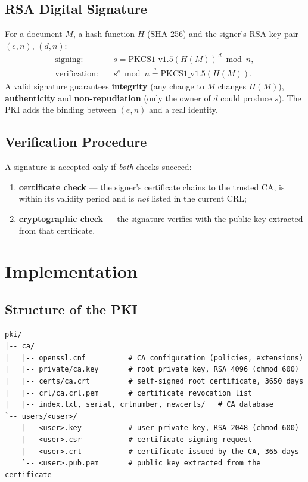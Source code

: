 \documentclass[12pt,a4paper]{article}
\begin{document}
\subsection{RSA Digital Signature}
For a document $M$, a hash function $H$ (SHA-256) and the signer's RSA key pair $(e,n)$, $(d,n)$:
\begin{align}
  \text{signing:}\quad & s = \mathrm{PKCS1\_v1.5}(H(M))^{\,d} \bmod n,\\
  \text{verification:}\quad & s^{e} \bmod n \stackrel{?}{=} \mathrm{PKCS1\_v1.5}(H(M)).
\end{align}
A valid signature guarantees \textbf{integrity} (any change to $M$ changes $H(M)$),
\textbf{authenticity} and \textbf{non-repudiation} (only the owner of $d$ could produce $s$).
The PKI adds the binding between $(e,n)$ and a real identity.

\subsection{Verification Procedure}
A signature is accepted only if \emph{both} checks succeed:
\begin{enumerate}
  \item \textbf{certificate check} — the signer's certificate chains to the trusted CA, is within
        its validity period and is \emph{not} listed in the current CRL;
  \item \textbf{cryptographic check} — the signature verifies with the public key extracted from
        that certificate.
\end{enumerate}

\section{Implementation}
\subsection{Structure of the PKI}
\begin{lstlisting}[style=sh, numbers=none, caption={Files created by \texttt{pki.sh}}]
pki/
|-- ca/
|   |-- openssl.cnf          # CA configuration (policies, extensions)
|   |-- private/ca.key       # root private key, RSA 4096 (chmod 600)
|   |-- certs/ca.crt         # self-signed root certificate, 3650 days
|   |-- crl/ca.crl.pem       # certificate revocation list
|   |-- index.txt, serial, crlnumber, newcerts/   # CA database
`-- users/<user>/
    |-- <user>.key           # user private key, RSA 2048 (chmod 600)
    |-- <user>.csr           # certificate signing request
    |-- <user>.crt           # certificate issued by the CA, 365 days
    `-- <user>.pub.pem       # public key extracted from the certificate
\end{lstlisting}
\end{document}

